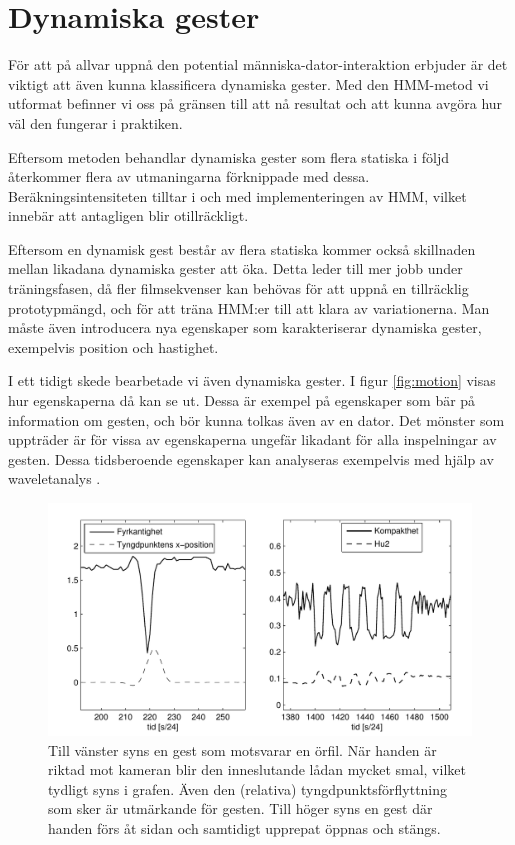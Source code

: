 \documentclass[../rapport_MVEX01-11-05]{subfiles}
\begin{document}
\section{Dynamiska gester}
För att på allvar uppnå den potential människa-dator-interaktion erbjuder
är det viktigt att även kunna klassificera dynamiska gester.
Med den HMM-metod vi utformat befinner vi oss på gränsen till
att nå resultat och att kunna avgöra hur väl den fungerar i praktiken.

Eftersom metoden behandlar dynamiska gester som flera 
statiska i följd återkommer flera av utmaningarna förknippade med dessa. 
Beräkningsintensiteten tilltar i och med implementeringen av HMM, vilket innebär 
att \MATLAB antagligen blir otillräckligt.

Eftersom en dynamisk gest består av flera statiska
kommer också skillnaden mellan likadana dynamiska gester att öka. Detta leder till 
mer jobb under träningsfasen, då fler filmsekvenser kan behövas för att uppnå en 
tillräcklig prototypmängd, och för att träna HMM:er till att klara av variationerna. 
Man måste även introducera nya egenskaper som karakteriserar dynamiska gester, 
exempelvis position och hastighet.

I ett tidigt skede bearbetade vi även dynamiska gester.
I figur \vref{fig:motion} visas hur egenskaperna då kan se ut.
Dessa är exempel på egenskaper som bär på
information om gesten, och bör kunna tolkas även av en dator.
Det mönster som uppträder är för vissa av egenskaperna
ungefär likadant för alla inspelningar av gesten.
Dessa tidsberoende egenskaper kan analyseras exempelvis
med hjälp av waveletanalys \cite{Hastie09}. 

\begin{figure}[tbp]
    \begin{center}
        \includegraphics[width=\columnwidth]{bilder/motion}
    \end{center}
    \caption{Till vänster syns en gest som motsvarar en örfil.
    När handen är riktad mot kameran blir den inneslutande
    lådan mycket smal, vilket tydligt syns i grafen.
    Även den (relativa) tyngdpunktsförflyttning som sker är utmärkande för
    gesten.
     Till höger syns en gest där handen förs åt sidan och samtidigt
    upprepat öppnas och stängs.}
    \label{fig:motion}
\end{figure}
\end{document}
